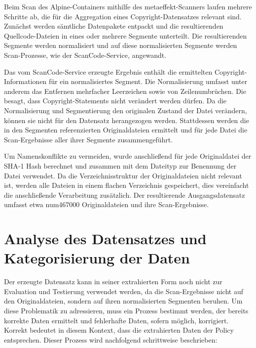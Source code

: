 Beim Scan des Alpine-Containers mithilfe des metaeffekt-Scanners laufen mehrere Schritte ab, die für die Aggregation eines Copyright-Datensatzes relevant sind.
Zunächst werden sämtliche Datenpakete entpackt und die resultierenden Quellcode-Dateien in eines oder mehrere Segmente unterteilt.
Die resultierenden Segmente werden normalisiert und auf diese normalisierten Segmente werden Scan-Prozesse, wie der ScanCode-Service, angewandt.

Das vom ScanCode-Service erzeugte Ergebnis enthält die ermittelten Copyright-Informationen für ein normalisiertes Segment.
Die Normalisierung umfasst unter anderem das Entfernen mehrfacher Leerzeichen sowie von Zeilenumbrüchen.
Die  besagt, dass Copyright-Statements nicht verändert werden dürfen.
Da die Normalisierung und Segmentierung den originalen Zustand der Datei verändern, können sie nicht für den Datensatz herangezogen werden.
Stattdessen werden die in den Segmenten referenzierten Originaldateien ermittelt und für jede Datei die Scan-Ergebnisse aller ihrer Segmente zusammengeführt.

Um Namenskonflikte zu vermeiden, wurde anschließend für jede Originaldatei der SHA-1 Hash berechnet und zusammen mit dem Dateityp zur Benennung der Datei verwendet.
Da die Verzeichnisstruktur der Originaldateien nicht relevant ist, werden alle Dateien in einem flachen Verzeichnis gespeichert, dies vereinfacht die anschließende Verarbeitung zusätzlich.
Der resultierende Ausgangsdatensatz umfasst etwa num{467000} Originaldateien und ihre Scan-Ergebnisse.


\section{Analyse des Datensatzes und Kategorisierung der Daten}\label{sec:analyse-datensatz}

Der erzeugte Datensatz kann in seiner extrahierten Form noch nicht zur Evaluation und Testierung verwendet werden, da die Scan-Ergebnisse nicht auf den Originaldateien, sondern auf ihren normalisierten Segmenten beruhen.
Um diese Problematik zu adressieren, muss ein Prozess bestimmt werden, der bereits korrekte Daten ermittelt und fehlerhafte Daten, sofern möglich, korrigiert.
Korrekt bedeutet in diesem Kontext, dass die extrahierten Daten der Policy entsprechen.
Dieser Prozess wird nachfolgend schrittweise beschrieben:

